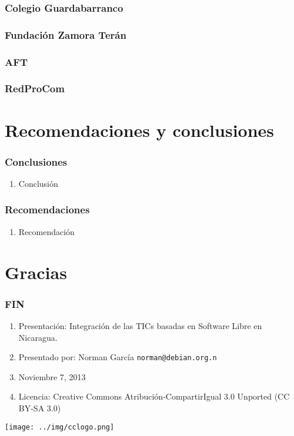 \documentclass{beamer}
\begin{document}
\begin{frame}
\frametitle{Colegio Guardabarranco}
\end{frame}

\begin{frame}
\frametitle{Fundaci\'on Zamora Ter\'an}
\end{frame}

\begin{frame}
\frametitle{AFT}
\end{frame}

\begin{frame}
\frametitle{RedProCom}
\end{frame}

\section {Recomendaciones y conclusiones}
\begin{frame}
\frametitle{Conclusiones}
	\begin{enumerate}	
		\pause \item Conclusi\'on
	\end{enumerate}
\end{frame}


\begin{frame} 
\frametitle{Recomendaciones}
	\begin{enumerate}
		\pause \item Recomendaci\'on
	\end{enumerate}
\end{frame}


\section{Gracias}


\begin{frame}
\frametitle{FIN}
	\begin{enumerate}
		\pause \item Presentaci\'on: Integración de las TICs basadas en Software Libre en Nicaragua.
		\pause \item Presentado por: Norman Garc\'ia  \texttt{norman@debian.org.n}
		\pause \item Noviembre 7, 2013
		\pause \item Licencia: Creative Commons Atribuci\'on-CompartirIgual 3.0 Unported (CC BY-SA 3.0)
	\end{enumerate}

	\begin{center}
  		 \texttt{[image: ../img/cclogo.png]}
	\end{center}

\end{frame}
\end{document}
